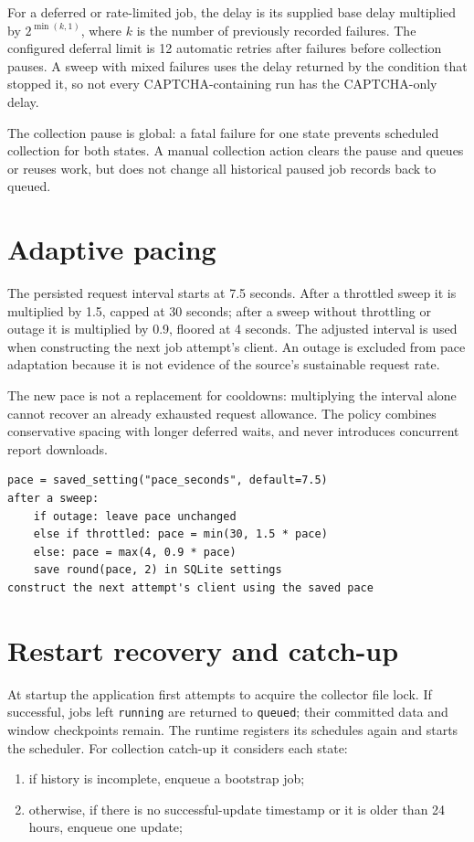 \documentclass[12pt,a4paper,oneside]{report}
\numberwithin{equation}{chapter}
\numberwithin{figure}{chapter}
\numberwithin{table}{chapter}
\theoremstyle{definition}
\begin{document}
For a deferred or rate-limited job, the delay is its supplied base delay multiplied by $2^{\min(k,1)}$, where $k$ is the number of previously recorded failures. The configured deferral limit is 12 automatic retries after failures before collection pauses. A sweep with mixed failures uses the delay returned by the condition that stopped it, so not every CAPTCHA-containing run has the CAPTCHA-only delay.

The collection pause is global: a fatal failure for one state prevents scheduled collection for both states. A manual collection action clears the pause and queues or reuses work, but does not change all historical paused job records back to queued.

\section{Adaptive pacing}
The persisted request interval starts at 7.5 seconds. After a throttled sweep it is multiplied by 1.5, capped at 30 seconds; after a sweep without throttling or outage it is multiplied by 0.9, floored at 4 seconds. The adjusted interval is used when constructing the next job attempt's client. An outage is excluded from pace adaptation because it is not evidence of the source's sustainable request rate.

The new pace is not a replacement for cooldowns: multiplying the interval alone cannot recover an already exhausted request allowance. The policy combines conservative spacing with longer deferred waits, and never introduces concurrent report downloads.

\begin{lstlisting}[caption={Algorithm: persist a learned request interval}]
pace = saved_setting("pace_seconds", default=7.5)
after a sweep:
    if outage: leave pace unchanged
    else if throttled: pace = min(30, 1.5 * pace)
    else: pace = max(4, 0.9 * pace)
    save round(pace, 2) in SQLite settings
construct the next attempt's client using the saved pace
\end{lstlisting}

\section{Restart recovery and catch-up}
At startup the application first attempts to acquire the collector file lock. If successful, jobs left \texttt{running} are returned to \texttt{queued}; their committed data and window checkpoints remain. The runtime registers its schedules again and starts the scheduler. For collection catch-up it considers each state:
\begin{enumerate}
  \item if history is incomplete, enqueue a bootstrap job;
  \item otherwise, if there is no successful-update timestamp or it is older than 24 hours, enqueue one update;
\end{enumerate}
\end{document}
